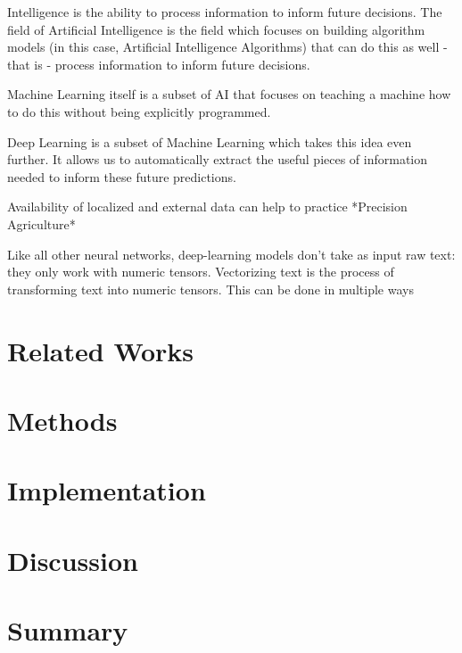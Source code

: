 \documentclass[
]{thesis-ekf}
\begin{document}
Intelligence is the ability to process information to inform future decisions. The field of Artificial Intelligence is the field which focuses on building algorithm models (in this case, Artificial Intelligence \cite{black2009books} Algorithms) that can do this as well - that is - process information to inform future decisions.

Machine Learning itself is a subset of AI that focuses on teaching a machine how to do this without being explicitly programmed. 

Deep Learning is a subset of Machine Learning which takes this idea even further. It allows us to automatically extract the useful pieces of information needed to inform these future predictions.

Availability of localized and external data can help to practice *Precision Agriculture*
 
 Like all other neural networks, deep-learning models don't take as input raw text:
 they only work with numeric tensors. Vectorizing text is the process of transforming text
 into numeric tensors. This can be done in multiple ways


\chapter{Related Works}




\chapter{Methods}


\chapter{Implementation}


\chapter{Discussion}



\chapter{Summary}







\end{document}
